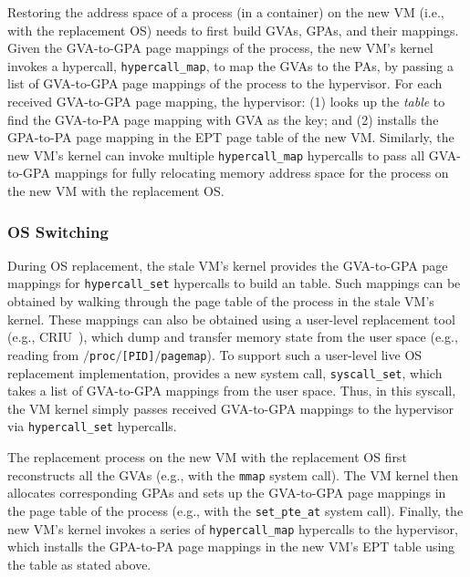 Restoring the address space of a process (in a container) on the new VM (i.e., with the replacement OS) needs to first build GVAs, GPAs, and their mappings. Given the GVA-to-GPA page mappings of the process, the new VM's kernel invokes a hypercall, \texttt{hypercall\_map}, to map the GVAs to the PAs, by passing a list of GVA-to-GPA page mappings of the process to the hypervisor. 
For each received GVA-to-GPA page mapping, the hypervisor: (1) looks up the {\em \arch table} to find the GVA-to-PA page mapping with GVA as the key; and (2) installs the GPA-to-PA page mapping in the EPT page table of the new VM. Similarly, the new VM's kernel can invoke multiple \texttt{hypercall\_map} hypercalls to pass all GVA-to-GPA mappings for fully relocating memory address space for the process on the new VM with the replacement OS. 
    
    
\subsubsection{OS Switching}
During OS replacement, the stale VM's kernel provides the GVA-to-GPA page mappings for \texttt{hypercall\_set} hypercalls to build an \arch table. Such mappings can be obtained by walking through the page table of the process in the stale VM's kernel. These mappings can also be obtained using a user-level replacement tool (e.g., CRIU~\cite{criu}), which dump and transfer memory state from the user space (e.g., reading from \texttt{$\slash$proc$\slash$[PID]$\slash$pagemap}). To support such a user-level live OS replacement implementation, \arch provides a new system call, \texttt{syscall\_set}, which takes a list of GVA-to-GPA mappings from the user space. Thus, in this syscall, the VM kernel simply passes received GVA-to-GPA mappings to the hypervisor via \texttt{hypercall\_set} hypercalls.  

The replacement process on the new VM with the replacement OS first reconstructs all the GVAs (e.g., with the \texttt{mmap} system call). The VM kernel then allocates corresponding GPAs and sets up the GVA-to-GPA page mappings in the page table of the process (e.g., with the \texttt{set\_pte\_at} system call). Finally, the new VM's kernel invokes a series of \texttt{hypercall\_map} hypercalls to the hypervisor, which installs the GPA-to-PA page mappings in the new VM's EPT table using the \arch table as stated above. 


